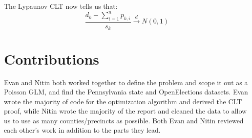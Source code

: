 \documentclass[10pt, letterpaper]{article}
\begin{document}
The Lypaunov CLT now tells us that: 
\[ \frac{d_k - \sum_{i = 1}^{n} p_{k, i} }{s_k} \stackrel{d} \longrightarrow N(0, 1) \] 

\newpage

\section{Contributions}
Evan and Nitin both worked together to define the problem and scope it out as a Poisson GLM, and find the Pennsylvania state and OpenElections datasets. Evan wrote the majority of code for the optimization algorithm and derived the CLT proof, while Nitin wrote the majority of the report and cleaned the data to allow us to use as many counties/precincts as possible. Both Evan and Nitin reviewed each other's work in addition to the parts they lead.

{\small


}
\end{document}
